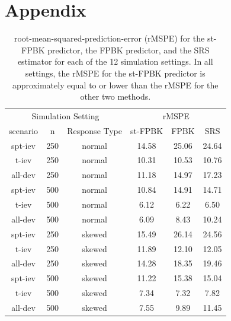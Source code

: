 \documentclass[]{interact}
\theoremstyle{plain}%
\theoremstyle{definition}
\theoremstyle{remark}
\begin{document}
\section{Appendix} \label{section:appendix}

\begin{table}[H]

\caption{\label{tab:simrmspetab}root-mean-squared-prediction-error (rMSPE) for the st-FPBK predictor, the FPBK predictor, and the SRS estimator for each of the 12 simulation settings. In all settings, the rMSPE for the st-FPBK predictor is approximately equal to or lower than the rMSPE for the other two methods.}
\centering
\begin{tabular}[t]{cccccc}
\toprule
\multicolumn{3}{c}{Simulation Setting} & \multicolumn{3}{c}{rMSPE} \\
\cmidrule(l{3pt}r{3pt}){1-3} \cmidrule(l{3pt}r{3pt}){4-6}
scenario & n & Response Type & st-FPBK & FPBK & SRS\\
\midrule
spt-iev & 250 & normal & 14.58 & 25.06 & 24.64\\
t-iev & 250 & normal & 10.31 & 10.53 & 10.76\\
all-dev & 250 & normal & 11.18 & 14.97 & 17.23\\
\midrule
spt-iev & 500 & normal & 10.84 & 14.91 & 14.71\\
t-iev & 500 & normal & 6.12 & 6.22 & 6.50\\
all-dev & 500 & normal & 6.09 & 8.43 & 10.24\\
\midrule
spt-iev & 250 & skewed & 15.49 & 26.14 & 24.56\\
t-iev & 250 & skewed & 11.89 & 12.10 & 12.05\\
all-dev & 250 & skewed & 14.28 & 18.35 & 19.46\\
\midrule
spt-iev & 500 & skewed & 11.22 & 15.38 & 15.04\\
t-iev & 500 & skewed & 7.34 & 7.32 & 7.82\\
all-dev & 500 & skewed & 7.55 & 9.89 & 11.45\\
\bottomrule
\end{tabular}
\end{table}
\end{document}

